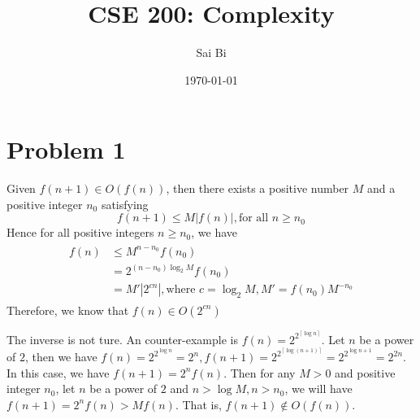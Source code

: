 \documentclass[a4paper,11pt]{article}
\providecommand{\myceil}[1]{\left \lceil #1 \right \rceil }
\theoremstyle{mytheor}
\begin{document}
\title{CSE 200: Complexity}

\author{Sai Bi}

\date{\today}

\maketitle

\section*{Problem 1}
Given $f(n+1) \in O(f(n))$, then there exists a positive number $M$ and a positive integer $n_0$ satisfying
\begin{equation}
  f(n+1) \leq M|f(n)|, \text{for all } n \geq n_0
\end{equation}
Hence for all positive integers $n \geq n_0$, we have
\begin{align}
  \begin{split}
  f(n) & \leq M^{n - n_0} f(n_0)\\
       & = 2^{(n-n_0)\log_2{M}} f(n_0) \\
       & = M' |2^{cn}|, \text{where } c = \log_2{M}, M' = f(n_0) M^{-n_0}
  \end{split}
\end{align}
Therefore, we know that $f(n) \in O(2^{cn})$

The inverse is not ture. An counter-example is $f(n) = 2^{2^{\myceil{\log n}}}$. Let $n$ be a power of $2$, then
we have $f(n) = 2^{2^{\log n}} = 2^n, f(n+1) = 2^{2^{\myceil{\log (n+1)}}} = 2^{2^{\log n + 1}} = 2^{2n}$. In this case,
we have $f(n+1) = 2^n f(n)$. Then for any $M > 0$ and positive integer $n_0$, let $n$ be a power of $2$ and $n > \log M, n > n_0$,
we will have $f(n+1) = 2^n f(n) > M f(n)$. That is, $f(n+1) \notin O(f(n))$.
\end{document}
